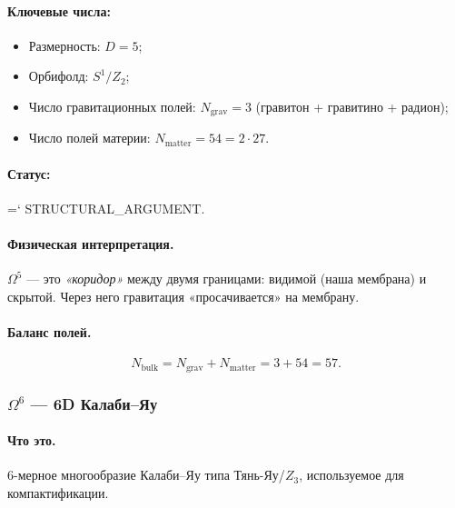 \documentclass[11pt,a4paper]{article}
\newcommand{\Omf}{\Omega^5}
\newcommand{\Oms}{\Omega^6}
\newcommand{\Nbulk}{N_{\text{bulk}}}
\renewcommand{\texttt}[1]{{\ttfamily\hyphenchar\font=`\- #1}}
\theoremstyle{definition}
\begin{document}
\paragraph{Ключевые числа:}
\begin{itemize}
    \item Размерность: $D = 5$;
    \item Орбифолд: $S^1/Z_2$;
    \item Число гравитационных полей: $N_{\text{grav}} = 3$ 
          (гравитон + гравитино + радион);
    \item Число полей материи: $N_{\text{matter}} = 54 = 2 \cdot 27$.
\end{itemize}

\paragraph{Статус:} \texttt{STRUCTURAL\_ARGUMENT}.

\paragraph{Физическая интерпретация.}
$\Omf$ — это \emph{«коридор»} между двумя границами: видимой 
(наша мембрана) и скрытой. Через него гравитация «просачивается» 
на мембрану.

\paragraph{Баланс полей.}
\begin{equation}
    \Nbulk = N_{\text{grav}} + N_{\text{matter}} 
    = 3 + 54 = 57.
\end{equation}

\subsubsection{$\Oms$ --- 6D Калаби--Яу}

\paragraph{Что это.}
6-мерное многообразие Калаби--Яу типа Тянь-Яу/$Z_3$, 
используемое для компактификации.
\end{document}
